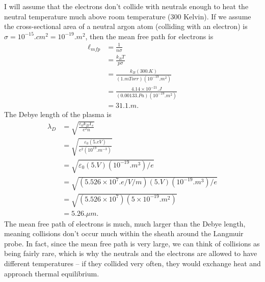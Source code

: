 \documentclass{article}
\begin{document}
\bigskip
\par
\begin{prob}
\end{prob}
I will assume that the electrons don't collide with neutrals enough to heat the neutral temperature much above room temperature (300 Kelvin). If we assume the cross-sectional area of a neutral argon atom (colliding with an electron) is $\sigma = 10^{-15} \si{.cm^2}=10^{-19} \si{.m^2}$, then the mean free path for electrons is
\begin{align*}
    \ell_{mfp} &= \frac{1}{n \sigma} \\
         &= \frac{k_B T}{p \sigma} \\
         &= \frac{k_B (300\si{.K})}{(1 \si{.mTorr})(10^{-19} \si{.m^2})} \\
         &= \frac{4.14 \times 10^{-21} \si{.J}}{(0.00133 \si{.Pa})(10^{-19} \si{.m^2})} \\
         &= 31.1 \si{.m}.
\end{align*}
The Debye length of the plasma is
\begin{align*}
    \lambda_D &= \sqrt{ \frac{\varepsilon_0 k_B T_e}{e^2 n} } \\
              &= \sqrt{ \frac{\varepsilon_0 (5 \si{.eV})}{e^2 (10^{19} \si{.m^{-3}})}} \\
              &= \sqrt{ \varepsilon_0 (5\si{.V})(10^{-19}\si{.m^3})/e } \\
              &= \sqrt{ (5.526 \times 10^7 \si{.e/V/m}) (5\si{.V})(10^{-19}\si{.m^3})/e } \\
              &= \sqrt{ (5.526 \times 10^7) (5\times 10^{-19}\si{.m^2}) } \\
              &= 5.26 \si{.\mu m}.
\end{align*}
The mean free path of electrons is much, much larger than the Debye length, meaning collisions don't occur much within the sheath around the Langmuir probe. In fact, since the mean free path is very large, we can think of collisions as being fairly rare, which is why the neutrals and the electrons are allowed to have different temperatures -- if they collided very often, they would exchange heat and approach thermal equilibrium.
\end{document}
